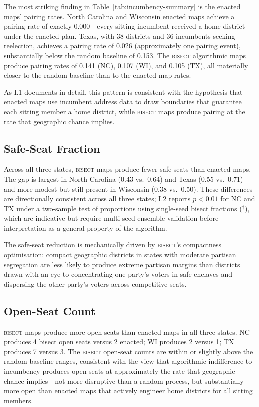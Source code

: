 The most striking finding in Table~\ref{tab:incumbency-summary} is the enacted maps'
pairing rates. North Carolina and Wisconsin enacted maps achieve a pairing rate of
exactly 0.000---every sitting incumbent received a home district under the enacted plan.
Texas, with 38 districts and 36 incumbents seeking reelection, achieves a pairing rate
of 0.026 (approximately one pairing event), substantially below the random baseline of
0.153. The \textsc{bisect} algorithmic maps produce pairing rates of 0.141 (NC),
0.107 (WI), and 0.105 (TX), all materially closer to the random baseline than to the
enacted map rates.

As I.1 documents in detail, this pattern is consistent with the hypothesis that enacted
maps use incumbent address data to draw boundaries that guarantee each sitting member
a home district, while \textsc{bisect} maps produce pairing at the rate that geographic
chance implies.

\subsection{Safe-Seat Fraction}

Across all three states, \textsc{bisect} maps produce fewer safe seats than enacted maps.
The gap is largest in North Carolina (0.43 vs.\ 0.64) and Texas (0.55 vs.\ 0.71) and
more modest but still present in Wisconsin (0.38 vs.\ 0.50). These differences are directionally consistent across all three states; I.2 reports
$p < 0.01$ for NC and TX under a two-sample test of proportions using single-seed bisect
fractions ($^\dagger$), which are indicative but require multi-seed ensemble validation
before interpretation as a general property of the algorithm.

The safe-seat reduction is mechanically driven by \textsc{bisect}'s compactness
optimisation: compact geographic districts in states with moderate partisan segregation
are less likely to produce extreme partisan margins than districts drawn with an eye to
concentrating one party's voters in safe enclaves and dispersing the other party's
voters across competitive seats.

\subsection{Open-Seat Count}

\textsc{bisect} maps produce more open seats than enacted maps in all three states.
NC produces 4 bisect open seats versus 2 enacted; WI produces 2 versus 1; TX produces
7 versus 3. The \textsc{bisect} open-seat counts are within or slightly above the
random-baseline ranges, consistent with the view that algorithmic indifference to
incumbency produces open seats at approximately the rate that geographic chance
implies---not more disruptive than a random process, but substantially more open than
enacted maps that actively engineer home districts for all sitting members.
